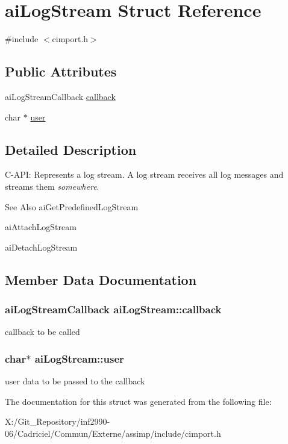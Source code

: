\hypertarget{structai_log_stream}{\section{ai\-Log\-Stream Struct Reference}
\label{structai_log_stream}
}


{\ttfamily \#include $<$cimport.\-h$>$}

\subsection*{Public Attributes}
\begin{DoxyCompactItemize}
\item 
ai\-Log\-Stream\-Callback \hyperlink{structai_log_stream_ac73ae46eee54ba0f920d6abb97c33e97}{callback}
\item 
char $\ast$ \hyperlink{structai_log_stream_a3382042e4171a6dd5a71d7f98741f86e}{user}
\end{DoxyCompactItemize}


\subsection{Detailed Description}
C-\/\-A\-P\-I\-: Represents a log stream. A log stream receives all log messages and streams them {\itshape somewhere}. \begin{DoxySeeAlso}{See Also}
ai\-Get\-Predefined\-Log\-Stream 

ai\-Attach\-Log\-Stream 

ai\-Detach\-Log\-Stream 
\end{DoxySeeAlso}


\subsection{Member Data Documentation}
\hypertarget{structai_log_stream_ac73ae46eee54ba0f920d6abb97c33e97}{
\subsubsection[{callback}]{\setlength{\rightskip}{0pt plus 5cm}ai\-Log\-Stream\-Callback ai\-Log\-Stream\-::callback}}\label{structai_log_stream_ac73ae46eee54ba0f920d6abb97c33e97}
callback to be called \hypertarget{structai_log_stream_a3382042e4171a6dd5a71d7f98741f86e}{
\subsubsection[{user}]{\setlength{\rightskip}{0pt plus 5cm}char$\ast$ ai\-Log\-Stream\-::user}}\label{structai_log_stream_a3382042e4171a6dd5a71d7f98741f86e}
user data to be passed to the callback 

The documentation for this struct was generated from the following file\-:\begin{DoxyCompactItemize}
\item 
X\-:/\-Git\-\_\-\-Repository/inf2990-\/06/\-Cadriciel/\-Commun/\-Externe/assimp/include/cimport.\-h\end{DoxyCompactItemize}
